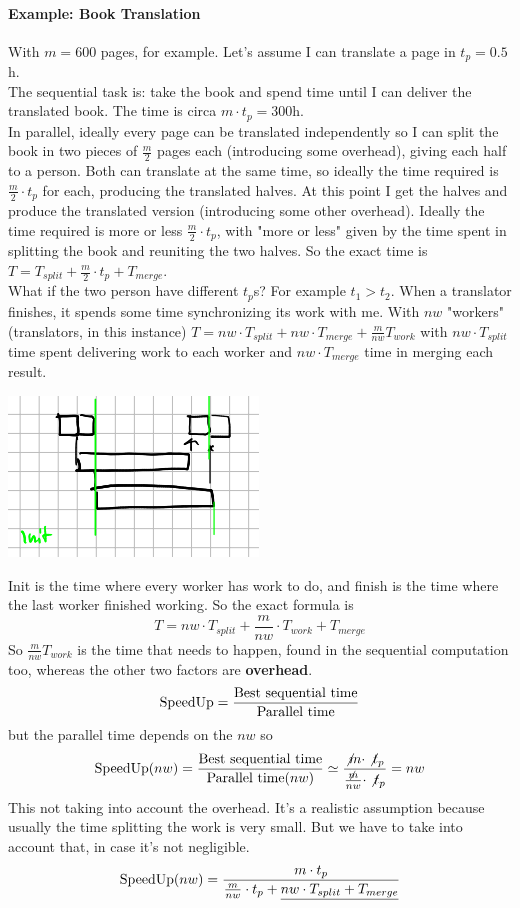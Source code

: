 \documentclass[10pt]{report}
\begin{document}
\paragraph{Example: Book Translation} With $m=600$ pages, for example. Let's assume I can translate a page in $t_p = 0.5$h.\\
The sequential task is: take the book and spend time until I can deliver the translated book. The time is circa $m\cdot t_p = 300$h.\\
In parallel, ideally every page can be translated independently so I can split the book in two pieces of $\frac{m}{2}$ pages each (introducing some overhead), giving each half to a person. Both can translate at the same time, so ideally the time required is $\frac{m}{2}\cdot t_p$ for each, producing the translated halves. At this point I get the halves and produce the translated version (introducing some other overhead). Ideally the time required is more or less $\frac{m}{2}\cdot t_p$, with "more or less" given by the time spent in splitting the book and reuniting the two halves. So the exact time is $T = T_{split} + \frac{m}{2} \cdot t_p + T_{merge}$.\\
What if the two person have different $t_p$s? For example $t_1 > t_2$. When a translator finishes, it spends some time synchronizing its work with me. With $nw$ "workers" (translators, in this instance) $T = nw\cdot T_{split} + nw\cdot T_{merge} + \frac{m}{nw}T_{work}$ with $nw\cdot T_{split}$ time spent delivering work to each worker and $nw\cdot T_{merge}$ time in merging each result.\\
\begin{center}
	\includegraphics[scale=0.75]{26.png}
\end{center}
Init is the time where every worker has work to do, and finish is the time where the last worker finished working. So the exact formula is
$$T = nw\cdot T_{split} + \frac{m}{nw}\cdot T_{work} + T_{merge}$$
So $\frac{m}{nw}T_{work}$ is the time that needs to happen, found in the sequential computation too, whereas the other two factors are \textbf{overhead}.
$$\hbox{SpeedUp} = \frac{\hbox{Best sequential time}}{\hbox{Parallel time}}$$ but the parallel time depends on the $nw$ so $$\hbox{SpeedUp}(nw) = \frac{\hbox{Best sequential time}}{\hbox{Parallel time}(nw)} \simeq \frac{\not m\cdot \not t_p}{\frac{\not m}{nw}\cdot \not t_p} = nw$$ This not taking into account the overhead. It's a realistic assumption because usually the time splitting the work is very small. But we have to take into account that, in case it's not negligible. $$\hbox{SpeedUp}(nw) = \frac{m\cdot t_p}{\frac{m}{nw}\cdot t_p + \underline{nw\cdot T_{split} + T_{merge}}}$$
\end{document}
